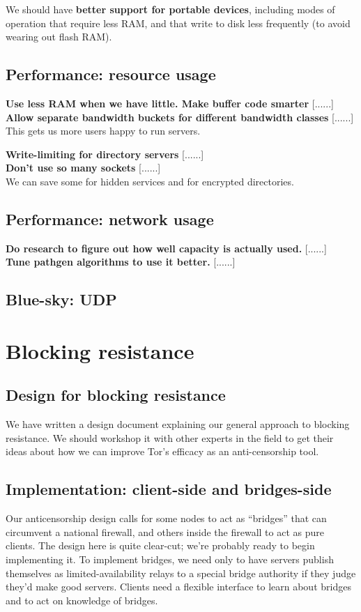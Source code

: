\documentclass{article}
\newcommand{\tmp}[1]{{\bf #1} [......] \\}
\begin{document}
We should have {\bf better support for portable devices}, including modes of
operation that require less RAM, and that write to disk less frequently (to
avoid wearing out flash RAM).

\subsection{Performance: resource usage}

\tmp{Use less RAM when we have little.  Make buffer code smarter}

\tmp{Allow separate bandwidth buckets for different bandwidth classes}  This
gets us more users happy to run servers.

\tmp{Write-limiting for directory servers}

\tmp{Don't use so many sockets} We can save some for hidden services and for
  encrypted directories.

\subsection{Performance: network usage}

\tmp{Do research to figure out how well capacity is actually used.}

\tmp{Tune pathgen algorithms to use it better.}


\subsection{Blue-sky: UDP}

\section{Blocking resistance}

\subsection{Design for blocking resistance}
We have written a design document explaining our general approach to blocking
resistance.  We should workshop it with other experts in the field to get
their ideas about how we can improve Tor's efficacy as an anti-censorship
tool.


\subsection{Implementation: client-side and bridges-side}
Our anticensorship design calls for some nodes to act as ``bridges'' that can
circumvent a national firewall, and others inside the firewall to act as pure
clients.  The design here is quite clear-cut; we're probably ready to begin
implementing it.  To implement bridges, we need only to have servers publish
themselves as limited-availability relays to a special bridge authority if
they judge they'd make good servers.  Clients need a flexible interface to
learn about bridges and to act on knowledge of bridges.
\end{document}
